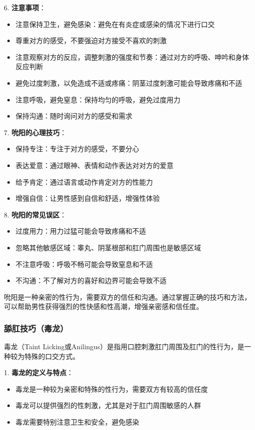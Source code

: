 \documentclass[12pt,UTF8]{ctexbook}
\begin{document}
6. \textbf{注意事项}：
  \begin{itemize}
  \item 注意保持卫生，避免感染：避免在有炎症或感染的情况下进行口交
  \item 尊重对方的感受，不要强迫对方接受不喜欢的刺激
  \item 注意观察对方的反应，调整刺激的强度和节奏：通过对方的呼吸、呻吟和身体反应判断
  \item 避免过度刺激，以免造成不适或疼痛：阴茎过度刺激可能会导致疼痛和不适
  \item 注意呼吸，避免窒息：保持均匀的呼吸，避免过度用力
  \item 保持沟通：随时询问对方的感受和需求
  \end{itemize}

7. \textbf{吮阳的心理技巧}：
  \begin{itemize}
  \item 保持专注：专注于对方的感受，不要分心
  \item 表达爱意：通过眼神、表情和动作表达对对方的爱意
  \item 给予肯定：通过语言或动作肯定对方的性能力
  \item 增强自信：让男性感到自信和舒适，增强性体验
  \end{itemize}

8. \textbf{吮阳的常见误区}：
  \begin{itemize}
  \item 过度用力：用力过猛可能会导致疼痛和不适
  \item 忽略其他敏感区域：睾丸、阴茎根部和肛门周围也是敏感区域
  \item 不注意呼吸：呼吸不畅可能会导致窒息和不适
  \item 不沟通：不了解对方的喜好和边界可能会导致不适
  \end{itemize}

吮阳是一种亲密的性行为，需要双方的信任和沟通。通过掌握正确的技巧和方法，可以帮助男性获得强烈的性快感和性高潮，增强亲密感和信任度。

\subsubsection{舔肛技巧（毒龙）}

毒龙（Taint Licking或Anilingus）是指用口腔刺激肛门周围及肛门的性行为，是一种较为特殊的口交方式。

1. \textbf{毒龙的定义与特点}：
  \begin{itemize}
  \item 毒龙是一种较为亲密和特殊的性行为，需要双方有较高的信任度
  \item 毒龙可以提供强烈的性刺激，尤其是对于肛门周围敏感的人群
  \item 毒龙需要特别注意卫生和安全，避免感染
  \end{itemize}
\end{document}
